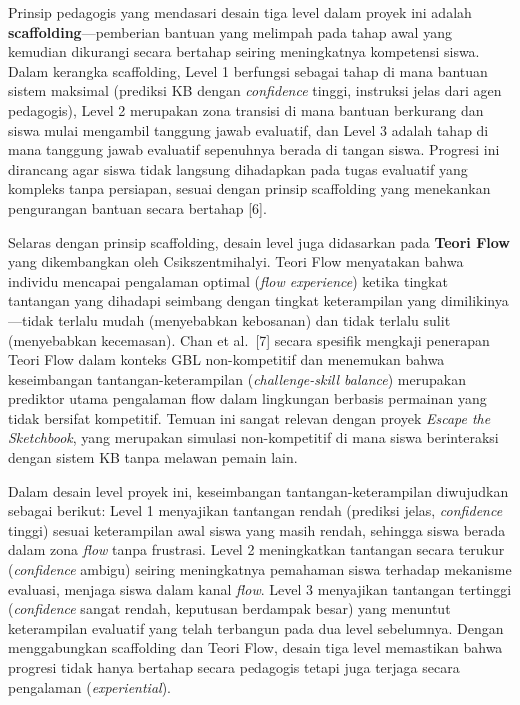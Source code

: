 \documentclass[10pt,twoside,openright]{report}
\begin{document}
Prinsip pedagogis yang mendasari desain tiga level dalam proyek ini adalah \textbf{scaffolding}---pemberian bantuan yang melimpah pada tahap awal yang kemudian dikurangi secara bertahap seiring meningkatnya kompetensi siswa. Dalam kerangka scaffolding, Level 1 berfungsi sebagai tahap di mana bantuan sistem maksimal (prediksi KB dengan \textit{confidence} tinggi, instruksi jelas dari agen pedagogis), Level 2 merupakan zona transisi di mana bantuan berkurang dan siswa mulai mengambil tanggung jawab evaluatif, dan Level 3 adalah tahap di mana tanggung jawab evaluatif sepenuhnya berada di tangan siswa. Progresi ini dirancang agar siswa tidak langsung dihadapkan pada tugas evaluatif yang kompleks tanpa persiapan, sesuai dengan prinsip scaffolding yang menekankan pengurangan bantuan secara bertahap [6].

Selaras dengan prinsip scaffolding, desain level juga didasarkan pada \textbf{Teori Flow} yang dikembangkan oleh Csikszentmihalyi. Teori Flow menyatakan bahwa individu mencapai pengalaman optimal (\textit{flow experience}) ketika tingkat tantangan yang dihadapi seimbang dengan tingkat keterampilan yang dimilikinya---tidak terlalu mudah (menyebabkan kebosanan) dan tidak terlalu sulit (menyebabkan kecemasan). Chan et al.\ [7] secara spesifik mengkaji penerapan Teori Flow dalam konteks GBL non-kompetitif dan menemukan bahwa keseimbangan tantangan-keterampilan (\textit{challenge-skill balance}) merupakan prediktor utama pengalaman flow dalam lingkungan berbasis permainan yang tidak bersifat kompetitif. Temuan ini sangat relevan dengan proyek \textit{Escape the Sketchbook}, yang merupakan simulasi non-kompetitif di mana siswa berinteraksi dengan sistem KB tanpa melawan pemain lain.

Dalam desain level proyek ini, keseimbangan tantangan-keterampilan diwujudkan sebagai berikut: Level 1 menyajikan tantangan rendah (prediksi jelas, \textit{confidence} tinggi) sesuai keterampilan awal siswa yang masih rendah, sehingga siswa berada dalam zona \textit{flow} tanpa frustrasi. Level 2 meningkatkan tantangan secara terukur (\textit{confidence} ambigu) seiring meningkatnya pemahaman siswa terhadap mekanisme evaluasi, menjaga siswa dalam kanal \textit{flow}. Level 3 menyajikan tantangan tertinggi (\textit{confidence} sangat rendah, keputusan berdampak besar) yang menuntut keterampilan evaluatif yang telah terbangun pada dua level sebelumnya. Dengan menggabungkan scaffolding dan Teori Flow, desain tiga level memastikan bahwa progresi tidak hanya bertahap secara pedagogis tetapi juga terjaga secara pengalaman (\textit{experiential}).
\end{document}
